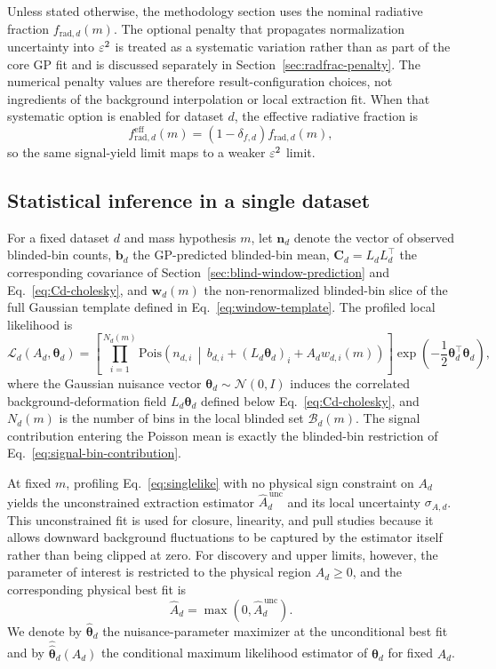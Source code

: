 Unless stated otherwise, the methodology section uses the nominal radiative fraction
$f_{\mathrm{rad},d}(m)$. The optional penalty that propagates normalization uncertainty
into $\varepsilon^2$ is treated as a systematic variation rather than as part of the core GP
fit and is discussed separately in Section~\ref{sec:radfrac-penalty}. The numerical
penalty values are therefore result-configuration choices, not ingredients of the
background interpolation or local extraction fit. When that systematic option is
enabled for dataset $d$, the effective radiative fraction is
\begin{equation}
f_{\mathrm{rad},d}^{\mathrm{eff}}(m)
= \left(1-\delta_{f,d}\right) f_{\mathrm{rad},d}(m),
\end{equation}
so the same signal-yield limit maps to a weaker $\varepsilon^2$ limit.

\subsection{Statistical inference in a single dataset}

For a fixed dataset $d$ and mass hypothesis $m$, let $\bm{n}_d$ denote the vector of
observed blinded-bin counts, $\bm{b}_d$ the GP-predicted blinded-bin mean,
$\bm{C}_d=L_dL_d^\top$ the corresponding covariance of
Section~\ref{sec:blind-window-prediction} and Eq.~\eqref{eq:Cd-cholesky}, and
$\bm{w}_d(m)$ the
non-renormalized blinded-bin slice of the full Gaussian template defined in
Eq.~\eqref{eq:window-template}. The profiled local likelihood is
\begin{equation}
\mathcal{L}_d(A_d,\bm{\theta}_d)
=
\left[
\prod_{i=1}^{N_d(m)}
\mathrm{Pois}\!\left(
n_{d,i}\,\middle|\,
b_{d,i} + (L_d\bm{\theta}_d)_i + A_d w_{d,i}(m)
\right)
\right]
\exp\!\left(-\frac{1}{2}\bm{\theta}_d^\top\bm{\theta}_d\right),
\label{eq:singlelike}
\end{equation}
where the Gaussian nuisance vector $\bm{\theta}_d\sim\mathcal{N}(0,I)$ induces the
correlated background-deformation field $L_d\bm{\theta}_d$ defined below
Eq.~\eqref{eq:Cd-cholesky}, and $N_d(m)$ is the number of bins in the local blinded
set $\mathcal{B}_d(m)$. The signal contribution entering the Poisson mean is exactly
the blinded-bin restriction of Eq.~\eqref{eq:signal-bin-contribution}.

At fixed $m$, profiling Eq.~\eqref{eq:singlelike} with no physical sign constraint on
$A_d$ yields the unconstrained extraction estimator $\hat A_d^{\,\mathrm{unc}}$ and
its local uncertainty $\sigma_{A,d}$. This unconstrained fit is used for closure,
linearity, and pull studies because it allows downward background fluctuations to be
captured by the estimator itself rather than being clipped at zero. For discovery and
upper limits, however, the parameter of interest is restricted to the
physical region $A_d\ge0$, and the corresponding physical best fit is
\begin{equation}
\hat A_d = \max\!\left(0,\hat A_d^{\,\mathrm{unc}}\right).
\end{equation}
We denote by $\hat{\bm{\theta}}_d$ the nuisance-parameter maximizer at the
unconditional best fit and by $\hat{\hat{\bm{\theta}}}_d(A_d)$ the conditional maximum
likelihood estimator of $\bm{\theta}_d$ for fixed $A_d$.

